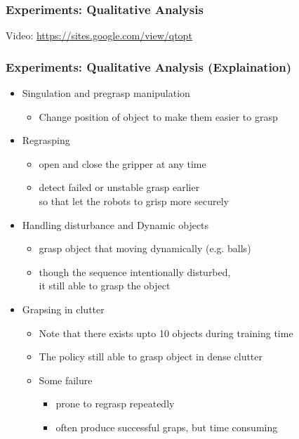 \documentclass{beamer}
\newcommand{\sixthSec}{Experiments}
\begin{document}
    \begin{frame}
      \frametitle{\sixthSec : Qualitative Analysis}
      \centering
      Video: \url{https://sites.google.com/view/qtopt}
    \end{frame}

    \begin{frame}
      \frametitle{\sixthSec : Qualitative Analysis (Explaination)}
      \begin{itemize}
        \item Singulation and pregrasp manipulation
        \begin{itemize}
          \item Change position of object to make them easier to grasp
        \end{itemize}
        \pause
        \item Regrasping
        \begin{itemize}
          \item open and close the gripper at any time
          \item detect failed or unstable grasp earlier \\
                so that let the robots to grisp more securely
        \end{itemize}
        \pause
        \item Handling disturbance and Dynamic objects
        \begin{itemize}
          \item grasp object that moving dynamically (e.g. balls)
          \item though the sequence intentionally disturbed, \\ 
                it still able to grasp the object
        \end{itemize}
        \pause
        \item Grapsing in clutter
        \begin{itemize}
          \item Note that there exists upto 10 objects during training time
          \item The policy still able to grasp object in dense clutter
          \pause
          \item Some failure
          \begin{itemize}
            \item prone to regrasp repeatedly
            \item often produce successful graps, but time consuming
          \end{itemize}
        \end{itemize}
      \end{itemize}
    \end{frame}
\end{document}
